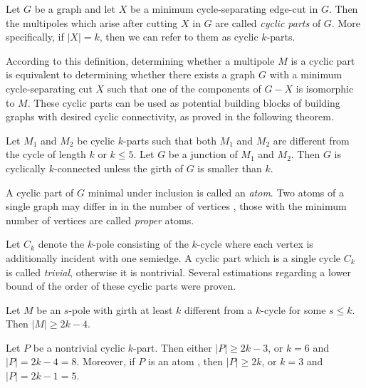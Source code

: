 \documentclass[12pt, twoside]{book}
\begin{document}
\begin{definition}
	Let $G$ be a graph and let $X$ be a minimum cycle-separating edge-cut in $G$. Then the multipoles which arise after cutting $X$ in $G$ are called \textit{cyclic parts} of $G$. More specifically, if $|X|=k$, then we can refer to them as cyclic $k$-parts.
\end{definition}

According to this definition, determining whether a multipole $M$ is a cyclic part is equivalent to determining whether there exists a graph $G$ with a minimum cycle-separating cut $X$ such that one of the components of $G-X$ is isomorphic to $M$. These cyclic parts can be used as potential building blocks of building graphs with desired cyclic connectivity, as proved in the following theorem.

\begin{theorem}
	Let $M_1$ and $M_2$ be cyclic $k$-parts such that both $M_1$ and $M_2$ are diﬀerent from the cycle of length $k$ or $k\leq 5$. Let $G$ be a junction of $M_1$ and $M_2$. Then $G$ is cyclically $k$-connected unless the girth of $G$ is smaller than $k$.
\end{theorem}

A cyclic part of $G$ minimal under inclusion is called an \textit{atom}. Two atoms of a single graph may differ in in the number of vertices \cite{atoms-of-cyclic}, those with the minimum number of vertices are called \textit{proper} atoms.

Let $C_k$ denote the $k$-pole consisting of the $k$-cycle where each vertex is additionally incident with one semiedge. A cyclic part which is a single cycle $C_k$ is called \textit{trivial}, otherwise it is nontrivial. Several estimations regarding a lower bound of the order of these cyclic parts were proven.

\begin{lemma}\label{lem:rajnik5.1}
	Let $M$ be an $s$-pole with girth at least $k$ different from a $k$-cycle for some $s\leq k$. Then $|M| \geq 2k - 4$.
\end{lemma}

\begin{theorem}
	Let $P$ be a nontrivial cyclic $k$-part. Then either $|P|\geq 2k-3$, or $k = 6$ and $|P|= 2k-4 = 8$. Moreover, if $P$ is an atom , then $|P| \geq 2k$, or $k = 3$ and $|P| = 2k-1 = 5$.
\end{theorem}
\end{document}
